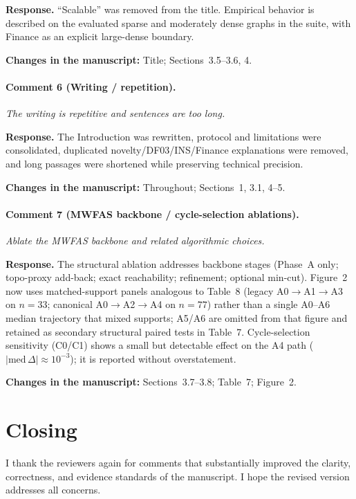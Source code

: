 \documentclass[11pt]{article}
\newcommand{\commentbox}[1]{\par\textit{#1}\par\medskip}
\newcommand{\changes}[1]{\textbf{Changes in the manuscript:} #1\par\medskip}
\begin{document}
\noindent\textbf{Response.}
``Scalable'' was removed from the title. Empirical behavior is described on the evaluated sparse and moderately dense graphs in the suite, with Finance as an explicit large-dense boundary.

\changes{Title; Sections~3.5--3.6, 4.}

\paragraph{Comment 6 (Writing / repetition).}
\commentbox{The writing is repetitive and sentences are too long.}

\noindent\textbf{Response.}
The Introduction was rewritten, protocol and limitations were consolidated, duplicated novelty/DF03/INS/Finance explanations were removed, and long passages were shortened while preserving technical precision.

\changes{Throughout; Sections~1, 3.1, 4--5.}

\paragraph{Comment 7 (MWFAS backbone / cycle-selection ablations).}
\commentbox{Ablate the MWFAS backbone and related algorithmic choices.}

\noindent\textbf{Response.}
The structural ablation addresses backbone stages (Phase~A only; topo-proxy add-back; exact reachability; refinement; optional min-cut). Figure~2 now uses matched-support panels analogous to Table~8 (legacy A0$\to$A1$\to$A3 on $n=33$; canonical A0$\to$A2$\to$A4 on $n=77$) rather than a single A0--A6 median trajectory that mixed supports; A5/A6 are omitted from that figure and retained as secondary structural paired tests in Table~7. Cycle-selection sensitivity (C0/C1) shows a small but detectable effect on the A4 path ($|\mathrm{med}\,\Delta|\approx 10^{-3}$); it is reported without overstatement.

\changes{Sections~3.7--3.8; Table~7; Figure~2.}

\section*{Closing}

I thank the reviewers again for comments that substantially improved the clarity, correctness, and evidence standards of the manuscript. I hope the revised version addresses all concerns.
\end{document}

